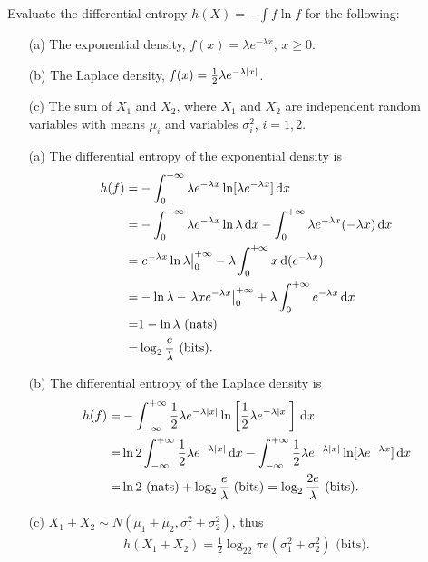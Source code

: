 \documentclass{assignment}
\begin{document}
\begin{prob}
    Evaluate the differential entropy $h(X)=-\int f\ln f$ for the following:
    \begin{itemize}
        \item[(a)] The exponential density, $f(x)=\lambda e^{-\lambda x}$, $x\geq 0$.
        \item[(b)] The Laplace density, $f(x)=\frac{1}{2}\lambda e^{-\lambda\left\lvert x\right\rvert}$.
        \item[(c)] The sum of $X_1$ and $X_2$, where $X_1$ and $X_2$ are independent random variables with means $\mu_i$ and variables $\sigma_i^2$, $i=1,2$.
    \end{itemize}
\end{prob}
\begin{sol}
    \begin{itemize}
        \item[(a)] The differential entropy of the exponential density is
        \begin{align}
            \notag h(f)=&-\int_0^{+\infty}\lambda e^{-\lambda x}\ln[\lambda e^{-\lambda x}]\,\mathrm{d}x\\
            \notag=&-\int_0^{+\infty}\lambda e^{-\lambda x}\ln\lambda\,\mathrm{d}x-\int_0^{+\infty}\lambda e^{-\lambda x}(-\lambda x)\,\mathrm{d}x\\
            \notag=&\left.e^{-\lambda x}\ln\lambda\right\rvert_0^{+\infty}-\lambda\int_0^{+\infty}x\,\mathrm{d}(e^{-\lambda x})\\
            \notag=&-\ln\lambda-\left.\lambda xe^{-\lambda x}\right\rvert_0^{+\infty}+\lambda\int_0^{+\infty}e^{-\lambda x}\,\mathrm{d}x\\
            \notag=&1-\ln\lambda\text{ (nats)}\\
            =&\log_2\frac{e}{\lambda}\text{ (bits)}.
        \end{align}
        \item[(b)] The differential entropy of the Laplace density is
        \begin{align}
            \notag h(f)=&-\int_{-\infty}^{+\infty}\frac{1}{2}\lambda e^{-\lambda\left\lvert x\right\rvert}\ln\left[\frac{1}{2}\lambda e^{-\lambda\left\lvert x\right\rvert}\right]\,\mathrm{d}x\\
            \notag=&\ln 2\int_{-\infty}^{+\infty}\frac{1}{2}\lambda e^{-\lambda\left\lvert x\right\rvert}\,\mathrm{d}x-\int_{-\infty}^{+\infty}\frac{1}{2}\lambda e^{-\lambda\left\lvert x\right\rvert}\ln[\lambda e^{-\lambda x}]\,\mathrm{d}x\\
            \notag=&\ln 2\text{ (nats)}+\log_2\frac{e}{\lambda}\text{ (bits)}=\log_2\frac{2e}{\lambda}\text{ (bits)}.
        \end{align}
        \item[(c)] $X_1+X_2\sim N(\mu_1+\mu_2,\sigma_1^2+\sigma_2^2)$, thus
        \begin{align}
            h(X_1+X_2)=\frac{1}{2}\log_22\pi e(\sigma_1^2+\sigma_2^2)\text{ (bits)}.
        \end{align}
    \end{itemize}
\end{sol}
\end{document}
